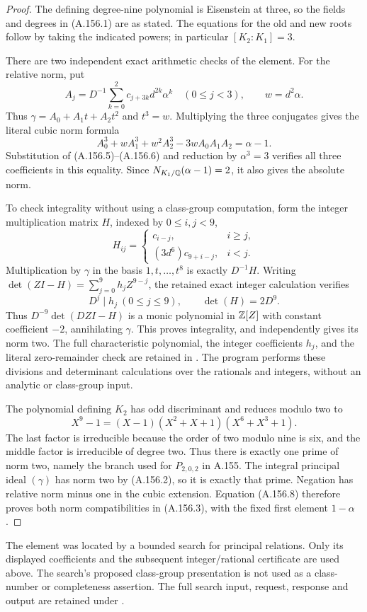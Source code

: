 \begin{proof}
The defining degree-nine polynomial is Eisenstein at three, so
the fields and degrees in (A.156.1) are as stated.
The equations for the old and new roots follow by taking the
indicated powers; in particular \([K_2:K_1]=3\).

There are two independent exact arithmetic checks of the element.
For the relative norm, put
\[
 A_j=D^{-1}\sum_{k=0}^{2}c_{j+3k}d^{2k}\alpha^k\quad(0\leq j<3),
 \qquad w=d^2\alpha.
\tag{A.156.7}
\]
Thus \(\gamma=A_0+A_1t+A_2t^2\) and \(t^3=w\).
Multiplying the three conjugates gives the literal cubic norm formula
\[
 A_0^3+wA_1^3+w^2A_2^3-3wA_0A_1A_2=\alpha-1.
\tag{A.156.8}
\]
Substitution of (A.156.5)--(A.156.6) and reduction by
\(\alpha^3=3\) verifies all three coefficients in this equality.
Since \(N_{K_1/\mathbb Q}(\alpha-1)=2\), it also gives the absolute norm.

To check integrality without using a class-group computation, form
the integer multiplication matrix \(H\), indexed by \(0\leq i,j<9\),
\[
 H_{ij}=\begin{cases}
             c_{i-j},&i\geq j,\\
             (3d^6)c_{9+i-j},&i<j.
          \end{cases}
\tag{A.156.9}
\]
Multiplication by \(\gamma\) in the basis \(1,t,\ldots,t^8\)
is exactly \(D^{-1}H\).
Writing
\(\det(ZI-H)=\sum_{j=0}^{9}h_jZ^{9-j}\), the retained exact
integer calculation verifies
\[
       D^j\mid h_j\ (0\leq j\leq9),\qquad
       \det(H)=2D^9.
\tag{A.156.10}
\]
Thus \(D^{-9}\det(DZI-H)\) is a monic polynomial in \(\mathbb Z[Z]\)
with constant coefficient \(-2\), annihilating \(\gamma\).
This proves integrality, and independently gives its norm two.
The full characteristic polynomial, the integer coefficients
\(h_j\), and the literal zero-remainder check are retained in
.
The program
performs these divisions and determinant calculations over the
rationals and integers, without an analytic or class-group input.

The polynomial defining \(K_2\) has odd discriminant and reduces
modulo two to
\[
 X^9-1=(X-1)(X^2+X+1)(X^6+X^3+1).
\tag{A.156.11}
\]
The last factor is irreducible because the order of two modulo nine
is six, and the middle factor is irreducible of degree two.
Thus there is exactly one prime of norm two, namely the branch
used for \(P_{2,0,2}\) in A.155.
The integral principal ideal \((\gamma)\) has norm two by
(A.156.2), so it is exactly that prime.
Negation has relative norm minus one in the cubic extension.
Equation (A.156.8) therefore proves both norm compatibilities in
(A.156.3), with the fixed first element \(1-\alpha\).
\end{proof}

The element was located by a bounded search for principal relations.
Only its displayed coefficients and the subsequent integer/rational
certificate are used above.  The search's proposed class-group
presentation is not used as a class-number or completeness assertion.
The full search input, request, response and output are retained under
.


